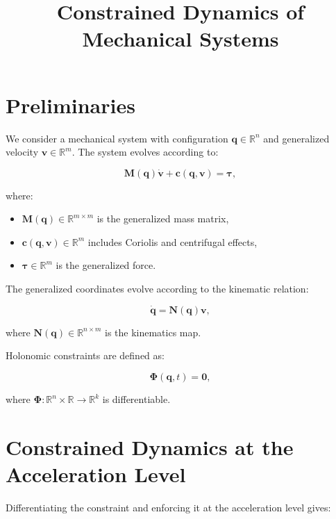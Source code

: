 \documentclass{article}
\title{Constrained Dynamics of Mechanical Systems}
\author{}
\date{}
\begin{document}
\maketitle

\section{Preliminaries}

We consider a mechanical system with configuration \( \bm{q} \in \mathbb{R}^n \)
and generalized velocity \( \bm{v} \in \mathbb{R}^m \). The system evolves
according to:

\begin{equation}
    \bm{M}(\bm{q}) \dot{\bm{v}} + \bm{c}(\bm{q}, \bm{v}) = \bm{\tau},
\end{equation}

where:
\begin{itemize}
    \item \( \bm{M}(\bm{q}) \in \mathbb{R}^{m \times m} \) is the generalized
    mass matrix,
    \item \( \bm{c}(\bm{q}, \bm{v}) \in \mathbb{R}^m \) includes Coriolis and
    centrifugal effects,
    \item \( \bm{\tau} \in \mathbb{R}^m \) is the generalized force.
\end{itemize}

The generalized coordinates evolve according to the kinematic relation:

\begin{equation}
    \dot{\bm{q}} = \bm{N}(\bm{q}) \bm{v},
\end{equation}

where \( \bm{N}(\bm{q}) \in \mathbb{R}^{n \times m} \) is the kinematics map.

Holonomic constraints are defined as:

\begin{equation}
    \bm{\Phi}(\bm{q}, t) = \bm{0},
\end{equation}

where \( \bm{\Phi}: \mathbb{R}^n \times \mathbb{R} \rightarrow \mathbb{R}^k \)
is differentiable.

\section{Constrained Dynamics at the Acceleration Level}

Differentiating the constraint and enforcing it at the acceleration level gives:
\end{document}
